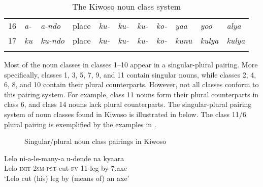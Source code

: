 \documentclass[output=paper]{langscibook}
\begin{document}
\begin{sidewaystable}
\begin{tabular}{lllllllllll}
16 & {\itshape a-} & {\itshape a-ndo} & place & \textit{ku-} & \textit{ku-} & \textit{ku-} & {\itshape ko-} & {\itshape yaa} & \textit{yoo} & {\itshape alya}\\
17 & \textit{ku} & {\itshape ku-ndo} & place & \textit{ku-} & \textit{ku-} & \textit{ku-} & {\itshape ko-} & {\itshape kunu} & \textit{kulya} & {\itshape kulya}\\
\lspbottomrule
\end{tabular}
\caption{\label{tab:mallya:1} The Kiwoso noun class system}
\end{sidewaystable}

Most of the noun classes in classes 1–10 appear in a singular-plural pairing. More specifically, classes 1, 3, 5, 7, 9, and 11 contain singular nouns, while classes 2, 4, 6, 8, and 10 contain their plural counterparts. However, not all classes conform to this pairing system. For example, class 11 nouns form their plural counterparts in class 6, and class 14 nouns lack plural counterparts. The singular-plural pairing system of noun classes found in Kiwoso is illustrated in  below. The class 11/6 plural pairing is exemplified by the examples in .

\begin{figure}

\caption{\label{fig:mallya:1} Singular/plural noun class pairings in Kiwoso}
\end{figure}

\ea\label{ex:mallya:1}    
  \ea\label{ex:mallya:1a}
  \gll Lelo    ni-a-le-many-a      u-dende  na    kyaara\\
    Lelo    \textsc{init}-2\textsc{sm}-\textsc{pst}-cut-\textsc{fv}      11-leg      by    7.axe\\
  \glt ‘Lelo cut (his) leg by (means of) an axe’
\end{document}

